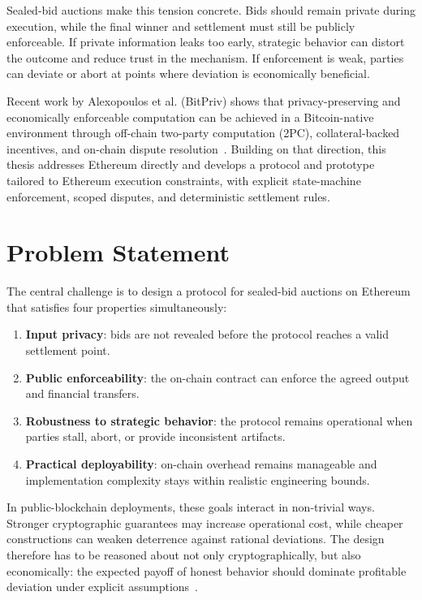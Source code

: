 \documentclass[final,twoside]{vutinfth}
\begin{document}
Sealed-bid auctions make this tension concrete. Bids should remain private during execution, while the final winner and settlement must still be publicly enforceable. If private information leaks too early, strategic behavior can distort the outcome and reduce trust in the mechanism. If enforcement is weak, parties can deviate or abort at points where deviation is economically beneficial.

Recent work by Alexopoulos et al. (BitPriv) shows that privacy-preserving and economically enforceable computation can be achieved in a Bitcoin-native environment through off-chain two-party computation (2PC), collateral-backed incentives, and on-chain dispute resolution~\cite{BitPriv2025}. Building on that direction, this thesis addresses Ethereum directly and develops a protocol and prototype tailored to Ethereum execution constraints, with explicit state-machine enforcement, scoped disputes, and deterministic settlement rules.

\section{Problem Statement}
The central challenge is to design a protocol for sealed-bid auctions on Ethereum that satisfies four properties simultaneously:
\begin{enumerate}
\item \textbf{Input privacy}: bids are not revealed before the protocol reaches a valid settlement point.
\item \textbf{Public enforceability}: the on-chain contract can enforce the agreed output and financial transfers.
\item \textbf{Robustness to strategic behavior}: the protocol remains operational when parties stall, abort, or provide inconsistent artifacts.
\item \textbf{Practical deployability}: on-chain overhead remains manageable and implementation complexity stays within realistic engineering bounds.
\end{enumerate}

In public-blockchain deployments, these goals interact in non-trivial ways. Stronger cryptographic guarantees may increase operational cost, while cheaper constructions can weaken deterrence against rational deviations. The design therefore has to be reasoned about not only cryptographically, but also economically: the expected payoff of honest behavior should dominate profitable deviation under explicit assumptions~\cite{Zhu2019PV2PC}.
\end{document}

